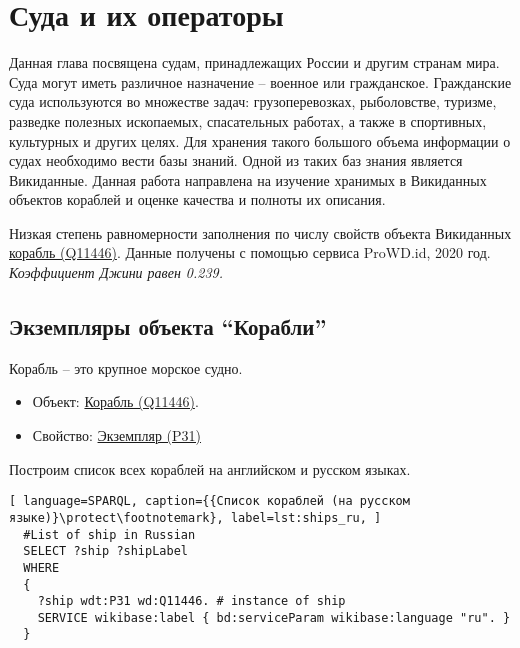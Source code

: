\chapter{Суда и их операторы}
\label{ch:ships-chapter}

Данная глава посвящена судам, принадлежащих России и другим странам мира. Суда могут иметь различное назначение -- военное или гражданское. Гражданские суда используются во множестве задач: грузоперевозках, рыболовстве, туризме, разведке полезных ископаемых, спасательных работах, а также в спортивных, культурных и других целях. Для хранения такого большого объема информации о судах необходимо вести базы знаний. Одной из таких баз знания является Викиданные. Данная работа направлена на изучение хранимых в Викиданных объектов кораблей и оценке качества и полноты их описания.


\begin{marginfigure}[0.0cm]
  {
    \setlength{\fboxsep}{0pt}%
    \setlength{\fboxrule}{1pt}%
  }
  \caption{
    Низкая степень равномерности заполнения по числу свойств объекта Викиданных \href{https://www.wikidata.org/wiki/Q11446}{корабль (Q11446)}.  Данные получены с помощью сервиса ProWD.id, 2020 год. \emph{Коэффициент Джини равен 0.239.}
    }%
    \label{fig:prowd_ships-unbalanced}%
  \end{marginfigure}


\section{Экземпляры объекта ``Корабли''}

Корабль -- это крупное морское судно.

\begin{itemize}
  \item Объект: \href{https://www.wikidata.org/wiki/Q11446}{Корабль (Q11446)}.
  \item Свойство: \href{https://www.wikidata.org/wiki/Property:P31}{Экземпляр (P31)}
\end{itemize}

Построим список всех кораблей на английском и русском языках.

\begin{lstlisting}[ language=SPARQL, caption={{Список кораблей (на русском языке)}\protect\footnotemark}, label=lst:ships_ru, ]
  #List of ship in Russian
  SELECT ?ship ?shipLabel
  WHERE
  {
    ?ship wdt:P31 wd:Q11446. # instance of ship
    SERVICE wikibase:label { bd:serviceParam wikibase:language "ru". }
  }
\end{lstlisting}


